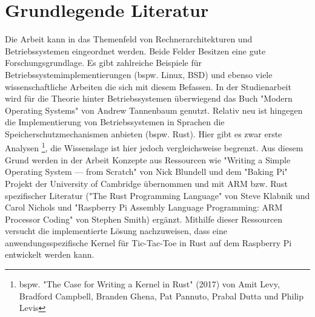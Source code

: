 \documentclass{scrartcl}
\begin{document}
\section{Grundlegende Literatur}

Die Arbeit kann in das Themenfeld von Rechnerarchitekturen und Betriebssystemen eingeordnet werden.
Beide Felder Besitzen eine gute Forschungsgrundlage.
Es gibt zahlreiche Beispiele für Betriebssystemimplementierungen (bspw. Linux, BSD) und ebenso viele wissenschaftliche Arbeiten die sich mit diesem Befassen.
In der Studienarbeit wird für die Theorie hinter Betriebssystemen überwiegend das Buch "Modern Operating Systems" von Andrew Tannenbaum genutzt.
Relativ neu ist hingegen die Implementierung von Betriebssystemen in Sprachen die Speicherschutzmechanismen anbieten (bspw. Rust).
Hier gibt es zwar erste Analysen \footnote{bspw. "The Case for Writing a Kernel in Rust" (2017) von Amit Levy, Bradford Campbell, Branden Ghena, Pat Pannuto, Prabal Dutta und Philip Levis}, die Wissenslage ist hier jedoch vergleichsweise begrenzt.
Aus diesem Grund werden in der Arbeit Konzepte aus Ressourcen wie "Writing a Simple Operating System — from Scratch" von Nick Blundell und dem "Baking Pi" Projekt der University of Cambridge übernommen und mit ARM bzw. Rust spezifischer Literatur ("The Rust Programming Language" von Steve Klabnik und Carol Nichols und "Raspberry Pi Assembly Language Programming: ARM Processor Coding" von Stephen Smith) ergänzt.
Mithilfe dieser Ressourcen versucht die implementierte Lösung nachzuweisen, dass eine anwendungsspezifische Kernel für Tic-Tac-Toe in Rust auf dem Raspberry Pi entwickelt werden kann.
\end{document}
